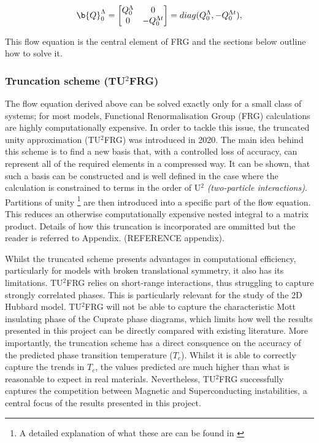 \documentclass[12pt]{article}
\begin{document}
\begin{equation}\label{Q0 term }
\b{Q}_0^{\Lambda} =
\begin{bmatrix}
Q_0^{\Lambda} & 0 \\
0 & -Q_0^{\Lambda t}
\end{bmatrix}
= diag(Q_0^{\Lambda}, - Q_0^{\Lambda t}),
\end{equation}

\noindent This flow equation is the central element of FRG and the sections below outline how to solve it.


\subsubsection{Truncation scheme (TU$^2$FRG)}
\label{subsubsec:Truncation scheme}


The flow equation derived above can be solved exactly only for a small class of systems; for most models, Functional Renormalisation Group (FRG) 
calculations are highly computationally expensive.
In order to tackle this issue, the truncated unity approximation (TU$^2$FRG) was introduced in 2020\cite{eckhardt2020truncated}. 
The main idea behind this scheme is to find a new basis that, with a controlled loss of accuracy, can represent all 
of the required elements in a compressed way. It can be shown\cite{lichtenstein2018functional}, that such a basis can be constructed and is 
well defined in the case where the calculation is constrained to terms in the order of U$^{2}$ \textit{(two-particle interactions)}.
Partitions of unity \footnote{A detailed explanation of what these are can be found in \cite{lichtenstein2018functional}} are then introduced into a specific part of the flow equation. This reduces an otherwise computationally expensive nested integral to a matrix product. 
Details of how this truncation is incorporated are ommitted but the reader is referred to Appendix. (REFERENCE appendix).\par
\medskip

\noindent Whilst the truncated scheme presents advantages in computational efficiency, particularly for models with broken translational symmetry, it also has its limitations. 
TU$^2$FRG relies on short-range interactions, thus struggling to capture strongly correlated phases. 
This is particularly relevant for the study of the 2D Hubbard model. TU$^2$FRG will not be able to capture
the characteristic Mott insulating phase of the Cuprate phase diagrams\cite{imada1998metal}, which limits how well the results presented in this project can be directly compared with existing literature. 
More importantly, the truncation scheme has a direct consquence on the accuracy of the predicted phase transition temperature ($T_c$). Whilst it is able to correctly capture
the trends in $T_c$, the values predicted are much higher than what is reasonable to expect in real materials.
Nevertheless, TU$^2$FRG successfully captures the competition between Magnetic and Superconducting instabilities, a central focus of the results presented in this project. 
\end{document}
